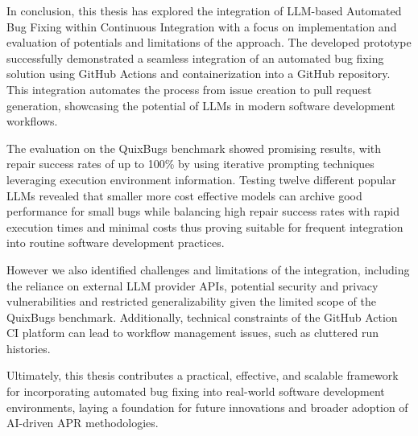 In conclusion, this thesis has explored the integration of LLM-based Automated Bug Fixing within Continuous Integration with a focus on implementation and evaluation of potentials and limitations of the approach. The developed prototype successfully demonstrated a seamless integration of an automated bug fixing solution using GitHub Actions and containerization into a GitHub repository. This integration automates the process from issue creation to pull request generation, showcasing the potential of LLMs in modern software development workflows.

The evaluation on the QuixBugs benchmark showed promising results, with repair success rates of up to 100\% by using iterative prompting techniques leveraging execution environment information. Testing twelve different popular \acp{LLM} revealed that smaller more cost effective models
can archive good performance for small bugs while balancing high repair success rates with rapid execution times and minimal costs thus proving suitable for frequent integration into routine software development practices.

However we also identified challenges and limitations of the integration, including the reliance on external LLM provider APIs, potential security and privacy vulnerabilities and restricted generalizability given the limited scope of the QuixBugs benchmark. Additionally, technical constraints of the GitHub Action CI platform can lead to workflow management issues, such as cluttered run histories.

Ultimately, this thesis contributes a practical, effective, and scalable framework for incorporating automated bug fixing into real-world software development environments, laying a foundation for future innovations and broader adoption of AI-driven \ac{APR} methodologies.